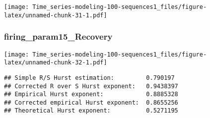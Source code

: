 \documentclass[
]{article}
\newenvironment{Shaded}{\begin{snugshade}}{\end{snugshade}}
\newcommand{\FunctionTok}[1]{\textcolor[rgb]{0.13,0.29,0.53}{\textbf{#1}}}
\newcommand{\NormalTok}[1]{#1}
\newcommand{\OtherTok}[1]{\textcolor[rgb]{0.56,0.35,0.01}{#1}}
\newcommand{\SpecialCharTok}[1]{\textcolor[rgb]{0.81,0.36,0.00}{\textbf{#1}}}
\newcommand{\StringTok}[1]{\textcolor[rgb]{0.31,0.60,0.02}{#1}}
\begin{document}
\texttt{[image: Time\_series-modeling-100-sequences1\_files/figure-latex/unnamed-chunk-31-1.pdf]}

\hypertarget{firing_param15_recovery}{%
\subsubsection{firing\_param15\_Recovery}\label{firing_param15_recovery}}

\begin{Shaded}
\end{Shaded}

\texttt{[image: Time\_series-modeling-100-sequences1\_files/figure-latex/unnamed-chunk-32-1.pdf]}

\begin{Shaded}
\end{Shaded}

\begin{verbatim}
## Simple R/S Hurst estimation:         0.790197 
## Corrected R over S Hurst exponent:   0.9438397 
## Empirical Hurst exponent:            0.8885328 
## Corrected empirical Hurst exponent:  0.8655256 
## Theoretical Hurst exponent:          0.5271195
\end{verbatim}

\begin{Shaded}
\end{Shaded}
\end{document}
